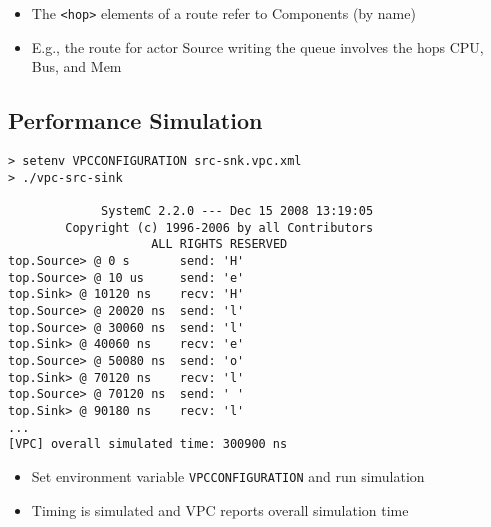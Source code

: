 \begin{frame}[t]
\begin{figure}
\centering
\resizebox{0.7\columnwidth}{!}{}
\end{figure}

\begin{itemize}
\item The \lstinline!<hop>! elements of a route refer to Components (by name)
\item E.g., the route for actor Source writing the queue involves the hops CPU, Bus, and Mem
\end{itemize}

\end{frame}




\subsection{Performance Simulation}


\begin{frame}[fragile=singleslide]
\begin{lstlisting}
> setenv VPCCONFIGURATION src-snk.vpc.xml
> ./vpc-src-sink

             SystemC 2.2.0 --- Dec 15 2008 13:19:05
        Copyright (c) 1996-2006 by all Contributors
                    ALL RIGHTS RESERVED            
top.Source> @ 0 s       send: 'H'
top.Source> @ 10 us     send: 'e'
top.Sink> @ 10120 ns    recv: 'H'
top.Source> @ 20020 ns  send: 'l'
top.Source> @ 30060 ns  send: 'l'
top.Sink> @ 40060 ns    recv: 'e'
top.Source> @ 50080 ns  send: 'o'
top.Sink> @ 70120 ns    recv: 'l'
top.Source> @ 70120 ns  send: ' '
top.Sink> @ 90180 ns    recv: 'l'
...
[VPC] overall simulated time: 300900 ns
\end{lstlisting}
\begin{itemize}
\item Set environment variable \lstinline!VPCCONFIGURATION! and run simulation
\item Timing is simulated and VPC reports overall simulation time 
\end{itemize}
\end{frame}


